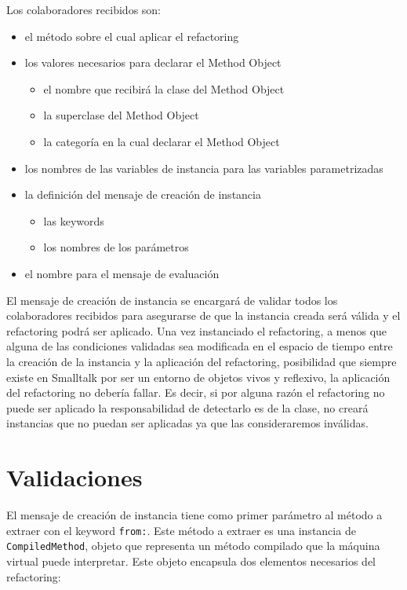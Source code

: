 Los colaboradores recibidos son:

\begin{itemize}
    \item el método sobre el cual aplicar el refactoring
    \item los valores necesarios para declarar el Method Object
    \begin{itemize}
        \item el nombre que recibirá la clase del Method Object
        \item la superclase del Method Object
        \item la categoría en la cual declarar el Method Object
    \end{itemize}
    \item los nombres de las variables de instancia para las variables
      parametrizadas
    \item la definición del mensaje de creación de instancia
    \begin{itemize}
        \item las keywords
        \item los nombres de los parámetros
    \end{itemize}
    \item el nombre para el mensaje de evaluación
\end{itemize}

El mensaje de creación de instancia se encargará de validar todos los
colaboradores recibidos para asegurarse de que la instancia creada será válida y
el refactoring podrá ser aplicado. Una vez instanciado el refactoring, a menos
que alguna de las condiciones validadas sea modificada en el espacio de tiempo
entre la creación de la instancia y la aplicación del refactoring, posibilidad
que siempre existe en Smalltalk por ser un entorno de objetos vivos y reflexivo,
la aplicación del refactoring no debería fallar. Es decir, si por alguna razón
el refactoring no puede ser aplicado la responsabilidad de detectarlo es de la
clase, no creará instancias que no puedan ser aplicadas ya que las
consideraremos inválidas.

\section{Validaciones}
El mensaje de creación de instancia tiene como primer parámetro al método a
extraer con el keyword \lstinline{from:}. Este método a extraer es una instancia
de \lstinline{CompiledMethod}, objeto que representa un método compilado que la
máquina virtual puede interpretar. Este objeto encapsula dos elementos
necesarios del refactoring:

